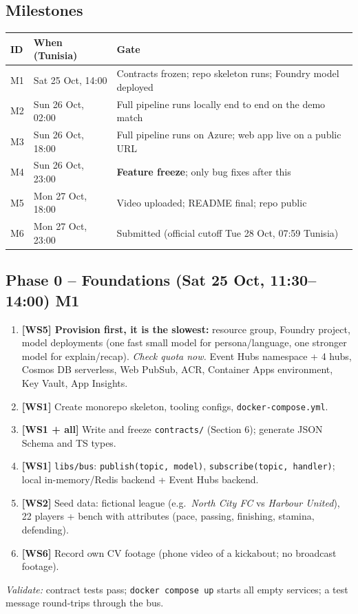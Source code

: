 \documentclass[11pt,a4paper]{article}
\begin{document}
\subsection*{Milestones}
\begin{tabularx}{\linewidth}{@{}l l Y@{}}
\toprule
ID & When (Tunisia) & Gate \\
\midrule
M1 & Sat 25 Oct, 14:00 & Contracts frozen; repo skeleton runs; Foundry model deployed \\
M2 & Sun 26 Oct, 02:00 & Full pipeline runs locally end to end on the demo match \\
M3 & Sun 26 Oct, 18:00 & Full pipeline runs on Azure; web app live on a public URL \\
M4 & Sun 26 Oct, 23:00 & \textbf{Feature freeze}; only bug fixes after this \\
M5 & Mon 27 Oct, 18:00 & Video uploaded; README final; repo public \\
M6 & Mon 27 Oct, 23:00 & Submitted (official cutoff Tue 28 Oct, 07:59 Tunisia) \\
\bottomrule
\end{tabularx}

\subsection[Phase 0 -- Foundations (Sat 25 Oct, 11:30--14:00)]{Phase 0 -- Foundations (Sat 25 Oct, 11:30--14:00) \hfill M1}
\begin{enumerate}
  \item \textbf{[WS5] Provision first, it is the slowest:} resource group, Foundry project,
        model deployments (one fast small model for persona/language, one stronger model for
        explain/recap). \emph{Check quota now.} Event Hubs namespace + 4 hubs, Cosmos DB serverless,
        Web PubSub, ACR, Container Apps environment, Key Vault, App Insights.
  \item \textbf{[WS1]} Create monorepo skeleton, tooling configs, \texttt{docker-compose.yml}.
  \item \textbf{[WS1 + all]} Write and freeze \texttt{contracts/} (Section 6); generate JSON Schema and TS types.
  \item \textbf{[WS1]} \texttt{libs/bus}: \texttt{publish(topic, model)}, \texttt{subscribe(topic, handler)};
        local in-memory/Redis backend + Event Hubs backend.
  \item \textbf{[WS2]} Seed data: fictional league (e.g.\ \emph{North City FC} vs \emph{Harbour United}),
        22 players + bench with attributes (pace, passing, finishing, stamina, defending).
  \item \textbf{[WS6]} Record own CV footage (phone video of a kickabout; no broadcast footage).
\end{enumerate}
\textit{Validate:} contract tests pass; \texttt{docker compose up} starts all empty services; a test message round-trips through the bus.
\end{document}
